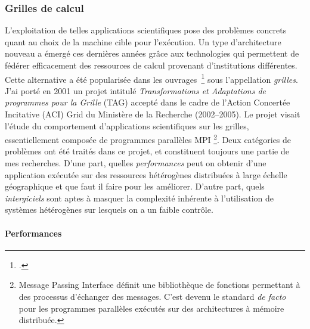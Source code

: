 \documentclass[11pt]{article}
\begin{document}
\subsubsection{Grilles de calcul}

L'exploitation de telles applications scientifiques pose des problèmes concrets 
quant au choix de la machine cible pour l'exécution. Un type d'architecture 
nouveau a émergé ces dernières années grâce aux technologies qui permettent
de fédérer efficacement des ressources de calcul provenant d'institutions différentes.
Cette alternative a été popularisée dans les ouvrages~\footcite{Foster97,Foster98} 
sous l'appellation \emph{grilles}. J'ai porté en 2001 un projet intitulé 
\textit{Transformations et Adaptations de programmes pour la Grille} (TAG)
accepté dans le cadre de l'Action Concertée Incitative (ACI) Grid du Ministère de 
la Recherche (2002--2005). Le projet visait l'étude du comportement d'applications 
scientifiques sur les grilles, essentiellement composée de programmes parallèles MPI%
\footnote{Message Passing Interface définit une bibliothèque de fonctions permettant 
à des processus d'échanger des messages. C'est devenu le standard \textit{de facto} 
pour les programmes parallèles exécutés sur des architectures à mémoire distribuée.}.
Deux catégories de problèmes ont été traités dans ce projet, et constituent toujours 
une partie de mes recherches.
D'une part, quelles \emph{performances} peut on obtenir d'une application exécutée sur des ressources
hétérogènes distribuées à large échelle géographique et que faut il faire pour les améliorer.
D'autre part, quels \emph{intergiciels} sont aptes à masquer la complexité inhérente à l'utilisation
de systèmes hétérogènes sur lesquels on a un faible contrôle. 


\paragraph{Performances} 
\end{document}
